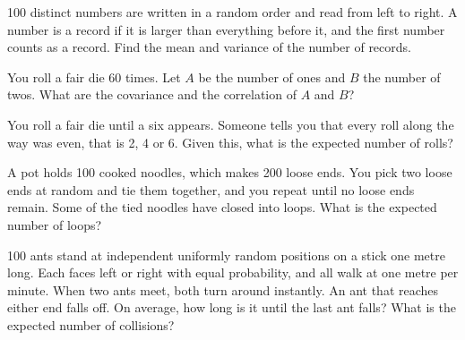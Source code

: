 \begin{question}\label{iq:iv1:expectation-and-indicators:12}
100 distinct numbers are written in a random order and read from left to right. A number is a record if it is
larger than everything before it, and the first number counts as a record. Find the mean and variance of
the number of records.
\end{question}

\begin{question}\label{iq:iv1:expectation-and-indicators:13}
You roll a fair die 60 times. Let $A$ be the number of ones and $B$ the number of twos. What are the covariance
and the correlation of $A$ and $B$?
\end{question}

\begin{question}\label{iq:iv1:expectation-and-indicators:14}
You roll a fair die until a six appears. Someone tells you that every roll along the way was even, that is 2, 4
or 6. Given this, what is the expected number of rolls?
\end{question}

\begin{question}\label{iq:iv1:expectation-and-indicators:15}
A pot holds 100 cooked noodles, which makes 200 loose ends. You pick two loose ends at random and tie them
together, and you repeat until no loose ends remain. Some of the tied noodles have closed into loops. What is the
expected number of loops?
\end{question}

\begin{question}\label{iq:iv1:expectation-and-indicators:16}
100 ants stand at independent uniformly random positions on a stick one metre long. Each faces left or right with
equal probability, and all walk at one metre per minute. When two ants meet, both turn around instantly. An ant
that reaches either end falls off. On average, how long is it until the last ant falls? What is the expected number
of collisions?
\end{question}

